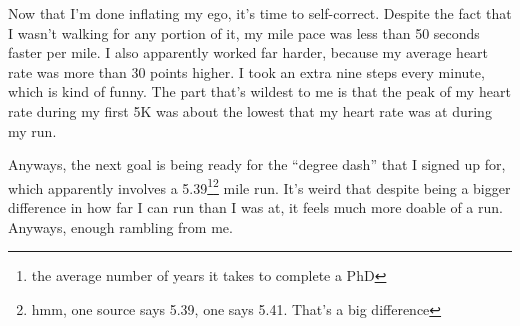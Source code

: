 \documentclass[12pt]{article}[titlepage]
\newcommand{\say}[1]{``#1''}
\newcommand{\1}{\={a}}
\newcommand{\2}{\={e}}
\newcommand{\3}{\={\i}}
\newcommand{\4}{\=o}
\newcommand{\5}{\=u}
\newcommand{\6}{\={A}}
\renewcommand{\,}{\textsuperscript{,}}
\begin{document}
Now that I'm done inflating my ego, it's time to self-correct.
Despite the fact that I wasn't walking for any portion of it, my mile pace was less than 50 seconds faster per mile.
I also apparently worked far harder, because my average heart rate was more than 30 points higher.
I took an extra nine steps every minute, which is kind of funny.
The part that's wildest to me is that the peak of my heart rate during my first 5K was about the lowest that my heart rate was at during my run.

Anyways, the next goal is being ready for the \say{degree dash} that I signed up for, which apparently involves a 5.39\footnote{the average number of years it takes to complete a PhD}\footnote{hmm, one source says 5.39, one says 5.41. That's a big difference} mile run.
It's weird that despite being a bigger difference in how far I can run than I was at, it feels much more doable of a run.
Anyways, enough rambling from me.
\end{document}
